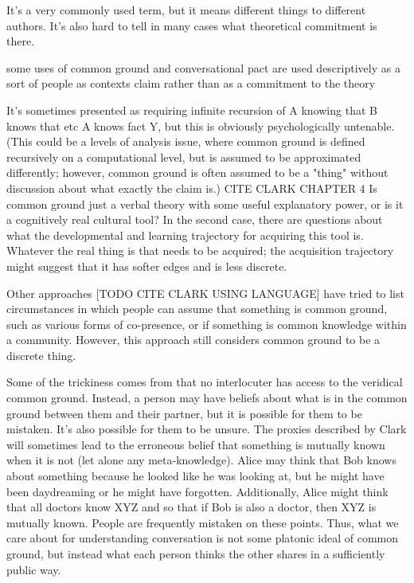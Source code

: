 \documentclass[]{article}
\begin{document}
It's a very commonly used term, but it means different things to different authors. It's also hard to tell in many cases what theoretical commitment is there. 

some uses of common ground and conversational pact are used descriptively as a sort of people as contexts claim \cite{leung2023} rather than as a commitment to the theory 

 It's sometimes presented as requiring infinite recursion of A knowing that B knows that etc A knows fact Y, but this is obviously psychologically untenable. (This could be a levels of analysis issue, where common ground is defined recursively on a computational level, but is assumed to be approximated differently; however, common ground is often assumed to be a "thing" without discussion about what exactly the claim is.) CITE CLARK CHAPTER 4 Is common ground just a verbal theory with some useful explanatory power, or is it a cognitively real cultural tool? In the second case, there are questions about what the developmental and learning trajectory for acquiring this tool is. Whatever the real thing is that needs to be acquired; the acquisition trajectory might suggest that it has softer edges and is less discrete. 

Other approaches [TODO CITE CLARK USING LANGUAGE] have tried to list circumstances in which people can assume that something is common ground, such as various forms of co-presence, or if something is common knowledge within a community. However, this approach still considers common ground to be a discrete thing. 

Some of the trickiness comes from that no interlocuter has access to the veridical common ground. Instead, a person may have beliefs about what is in the common ground between them and their partner, but it is possible for them to be mistaken. It's also possible for them to be unsure. The proxies described by Clark will sometimes lead to the erroneous belief that something is mutually known when it is not (let alone any meta-knowledge). Alice may think that Bob knows about something because he looked like he was looking at, but he might have been daydreaming or he might have forgotten. Additionally, Alice might think that all doctors know XYZ and so that if Bob is also a doctor, then XYZ is mutually known. People are frequently mistaken on these points. Thus, what we care about for understanding conversation is not some platonic ideal of common ground, but instead what each person thinks the other shares in a sufficiently public way. 
\end{document}
